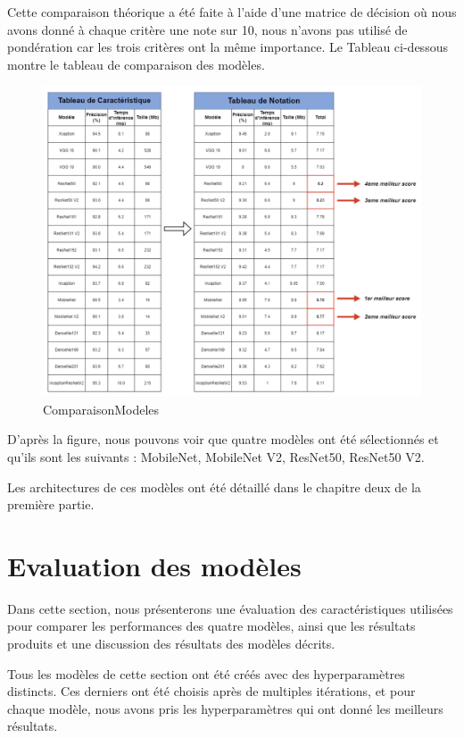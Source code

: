 Cette comparaison théorique a été faite à l'aide d'une matrice de décision où nous avons donné à chaque critère une note sur 10, nous n'avons pas utilisé de pondération car les trois critères ont la même importance. Le Tableau ci-dessous montre le tableau de comparaison des modèles. 
\newpage
\begin{figure}[h]
    \centering
    \includegraphics[width=14cm]{assets/PartTwo/ChapterTwo/ComparaisonModeles.png}
    \caption{ComparaisonModeles}
    \label{ComparaisonModeles}
    \end{figure}

    D'après la figure, nous pouvons voir que quatre modèles ont été sélectionnés et qu'ils sont les suivants : MobileNet, MobileNet V2, ResNet50, ResNet50 V2.

    Les architectures de ces modèles ont été détaillé dans le chapitre deux de la première partie. 

\section{Evaluation des modèles}
Dans cette section, nous présenterons une évaluation des caractéristiques utilisées pour comparer les performances des quatre modèles, ainsi que les résultats produits et une discussion des résultats des modèles décrits. 

Tous les modèles de cette section ont été créés avec des hyperparamètres distincts. Ces derniers ont été choisis après de multiples itérations, et pour chaque modèle, nous avons pris les hyperparamètres qui ont donné les meilleurs résultats. 


